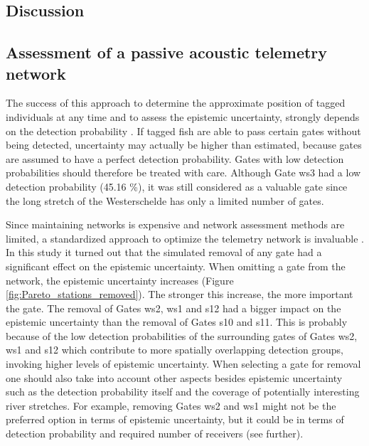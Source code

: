 \documentclass[preprint,12pt,authoryear]{elsarticle}
\begin{document}
\begin{spacing}{1.9}
\section{Discussion}
\label{Disc}

\subsection{Assessment of a passive acoustic telemetry network}
\label{subsec:Assessment of a passive acoustic telemetry network}

The success of this approach to determine the approximate position of tagged individuals at any time and to assess the epistemic uncertainty, strongly depends on the detection probability \citep{Heupel2006,Melnychuk2012,Reubens2018}. If tagged fish are able to pass certain gates without being detected, uncertainty may actually be higher than estimated, because gates are assumed to have a perfect detection probability. Gates with low detection probabilities should therefore be treated with care. Although Gate ws3 had a low detection probability (45.16 \%), it was still considered as a valuable gate since the long stretch of the Westerschelde has only a limited number of gates. 

Since maintaining networks is expensive  and network assessment methods are limited, a standardized approach to optimize the telemetry network is invaluable \citep{Steckenreuter2017,Kraus2018}. In this study it turned out that the simulated removal of any gate had a significant effect on the epistemic uncertainty. When omitting a gate from the network, the epistemic uncertainty increases (Figure \ref{fig:Pareto_stations_removed}). The stronger this increase, the more important the gate. The removal of Gates ws2, ws1 and s12 had a bigger impact on the epistemic uncertainty than the removal of Gates s10 and s11. This is probably because of the low detection probabilities of the surrounding gates of Gates ws2, ws1 and s12 which contribute to more spatially overlapping detection groups, invoking higher levels of epistemic uncertainty. When selecting a gate for removal one should also take into account other aspects besides epistemic uncertainty such as the detection probability itself and the coverage of potentially interesting river stretches. For example, removing Gates ws2 and ws1 might not be the preferred option in terms of epistemic uncertainty, but it could be in terms of detection probability and required number of receivers (see further). 


\end{spacing}
\end{document}

